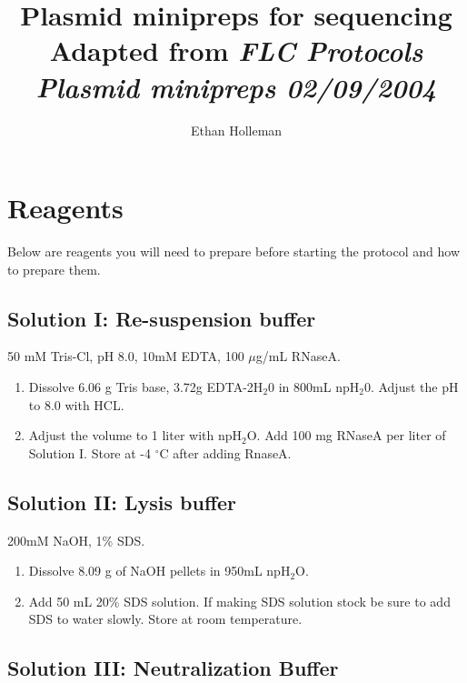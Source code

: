\documentclass[12pt]{article}
\theoremstyle{definition}
\begin{document}
\title{
	\textbf{Plasmid minipreps for sequencing}\\
	\large Adapted from \emph{FLC Protocols Plasmid minipreps 02/09/2004}}

\author{Ethan Holleman}
\maketitle

\section*{Reagents}

Below are reagents you will need to prepare before starting the protocol and how to prepare them.

\subsection*{Solution I: Re-suspension buffer}
\label{sec:sol-1}

50 mM Tris-Cl, pH 8.0, 10mM EDTA, 100 $\mu$g/mL RNaseA.

\begin{enumerate}
	\item Dissolve 6.06 g Tris base, 3.72g EDTA-2H$_2$0 in 800mL npH$_2$0. Adjust the pH to 8.0 with HCL. 
	\item Adjust the volume to 1 liter with npH$_2$O. Add 100 mg RNaseA per liter of Solution I. Store at -4 $^{\circ}$C after adding RnaseA.
\end{enumerate}

\subsection*{Solution II: Lysis buffer}
\label{sec:sol-2}

200mM NaOH, 1\% SDS.

\begin{enumerate}
	\item Dissolve 8.09 g of NaOH pellets in 950mL npH$_2$O. 
	\item  Add 50 mL 20\% SDS solution. If making SDS solution stock be sure to add SDS to water slowly. Store at room temperature.
\end{enumerate}

\subsection*{Solution III: Neutralization Buffer}
\label{sec:sol-3}
\end{document}
